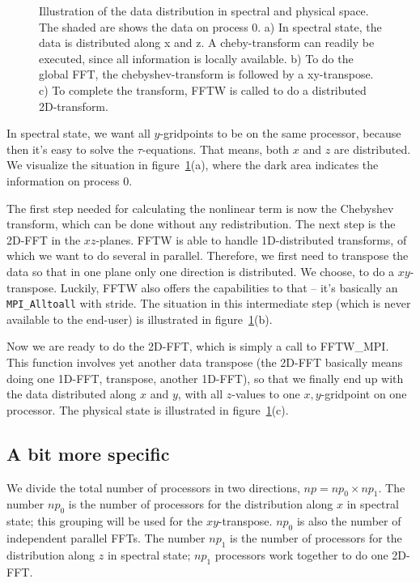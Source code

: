 \documentclass[a4paper,10pt,DIV=16]{scrartcl}
\begin{document}
		
		\begin{figure}[ht]
		
		\caption{\label{fig:distribution} Illustration of the data distribution in spectral and physical space. The shaded are shows the data on process 0.
			a) In spectral state, the data is distributed along x and z. A cheby-transform can readily be executed, since all information is locally available.
			b) To do the global FFT, the chebyshev-transform is followed by a xy-transpose.
			c) To complete the transform, FFTW is called to do a distributed 2D-transform.
		}
		\end{figure}
		In spectral state, we want all $y$-gridpoints to be on the same processor, because then it's easy to solve the $\tau$-equations.
		That means, both $x$ and $z$ are distributed.
		We visualize the situation in figure~\ref{fig:distribution}(a), where the dark area indicates the information on process 0.
		
		The first step needed for calculating the nonlinear term is now the Chebyshev transform, which can be done without any redistribution.
		The next step is the 2D-FFT in the $xz$-planes. FFTW is able to handle 1D-distributed transforms, of which we want to do several in parallel.
		Therefore, we first need to transpose the data so that in one plane only one direction is distributed.
		We choose, to do a $xy$-transpose.
		Luckily, FFTW also offers the capabilities to that -- it's basically an {\tt MPI\_Alltoall} with stride.
		The situation in this intermediate step (which is never available to the end-user) is illustrated in figure~\ref{fig:distribution}(b).
		
		Now we are ready to do the 2D-FFT, which is simply a call to FFTW\_MPI. This function involves yet another data transpose (the 2D-FFT basically means doing one 1D-FFT, transpose, another 1D-FFT), so that we finally end up with the data distributed along $x$ and $y$, with all $z$-values to one $x,y$-gridpoint on one processor.
		The physical state is illustrated in figure~\ref{fig:distribution}(c).
		
	\subsection{A bit more specific}
		We divide the total number of processors in two directions, $np = np_0 \times np_1$.
		The number $np_0$ is the number of processors for the distribution along $x$ in spectral state; this grouping will be used for the $xy$-transpose. $np_0$ is also the number of independent parallel FFTs.
		The number $np_1$ is the number of processors for the distribution along $z$ in spectral state; $np_1$ processors work together to do one 2D-FFT.
		
\end{document}
